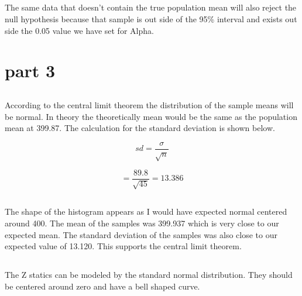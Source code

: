 \documentclass[letterpaper, onecolumn,10pt]{IEEEtran}
\begin{document}
            \subsection{}
                The same data that doesn't contain the true population mean will also reject the null hypothesis because that sample is out side of the 95\% interval and exists out side the 0.05 value we have set for Alpha.\\
                
        
        \section{part 3}
            \subsection{}
                According to the central limit theorem the distribution of the sample means will be normal. In theory the theoretically mean would be the same as the population mean at 399.87. The calculation for the standard deviation is shown below.
                
                \[
                    sd = \dfrac{\sigma}{\sqrt{n}}
                \]
                
                \[
                    = \dfrac{89.8}{\sqrt{45}} = 13.386
                \]
            \subsection{}
                The shape of the histogram appears as I would have expected normal centered around 400. The mean of the samples was 399.937 which is very close to our expected mean. The standard deviation of the samples was also close to our expected value of 13.120. This supports the central limit theorem.\\
                
                
            \subsection{}
                The Z statics can be modeled by the standard normal distribution. They should be centered around zero and have a bell shaped curve.\\
                
                
\end{document}
